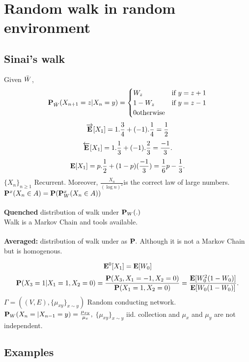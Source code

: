 \documentclass[main]{subfiles}
\begin{document}


\section{Random walk in random environment}
\subsection{Sinai's walk}
Given $\Bar{W}$,
\begin{align*}
	\P_{\Bar{W}}(X_{n+1}=z|X_n=y) =
	\begin{cases}
		W_z   & \text{if } y=z+1 \\
		1-W_z & \text{if } y=z-1 \\
		0   \text{otherwise}
	\end{cases}
\end{align*}
$$\overrightarrow{\E}[X_1]=1.\frac{3}{4}+(-1).\frac{1}{4}=\frac{1}{2}$$
$$\overleftarrow{\E}[X_1]=1.\frac{1}{3}+(-1).\frac{2}{3}=\frac{-1}{3}.$$
$$\E[X_1]=p.\frac{1}{2}+(1-p)(\frac{-1}{3})=\frac{1}{6}p-\frac
	{1}{3}.$$
$\{X_n\}_{n\geq1}$ Recurrent. Moreover, $\frac{X_a}{(\log n)^2}$is the correct law of large numbers.\\

$\P^x(X_n\in A)=\P(\P^{x}_W(X_n\in A))$\\\\
\textbf{Quenched} distribution of walk under $\P_W(.)$\\
Walk is a Markov Chain and tools available.
\\\\
\textbf{Averaged:} distribution of walk under as $\P.$
Although it is not a Markov Chain but is homogenous.

\begin{equation*}
	\E^0[X_1]=\E[W_0]
\end{equation*}
\begin{equation*}
	\P(X_3=1|X_1=1,X_2=0)=\frac{\P(X_3,X_1=-1,X_2=0)}{\P(X_1=1,X_2=0)}= \frac{\E[W_0^2(1-W_0)]}{\E[W_0(1-W_0)]}.
\end{equation*}
$\Gamma=((V,E),\{\mu_{xy}\}_{x\sim y})$ Random conducting network.
$\P_W(X_n=|X_{n-1}=y)=\frac{\mu_{xy}}{\mu_x},$
$\{\mu_{xy}\}_{x\sim y}$ iid. collection and $\mu_x$ and $\mu_y$ are not independent.

\subsection{Examples}
\end{document}
